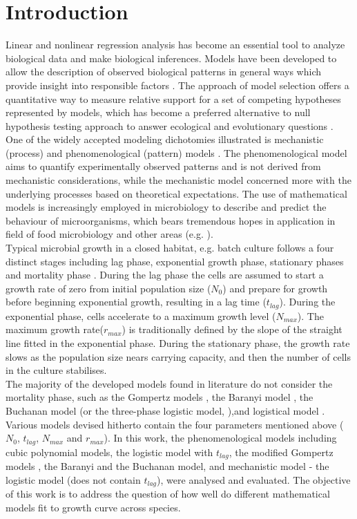 \documentclass[a4paper,11pt]{article}
\theoremstyle{definition}
\begin{document}
\section{Introduction}
Linear and nonlinear regression analysis has become an essential tool to analyze biological data and make biological inferences. Models have been developed to allow the description of observed biological patterns in general ways which provide insight into responsible factors \citep{johnson2004model}. The approach of model selection offers a quantitative way to measure relative support for a set of competing hypotheses represented by models, which has become a preferred alternative to null hypothesis testing approach to answer ecological and evolutionary questions \citep{hilborn1997ecological}. \\
One of the widely accepted modeling dichotomies illustrated is mechanistic (process) and phenomenological (pattern) models \citep{bolker2008ecological}. The phenomenological model aims to quantify experimentally observed patterns and is not derived from mechanistic considerations, while the mechanistic model concerned more with the underlying processes based on theoretical expectations. The use of mathematical models is increasingly employed in microbiology to describe and predict the behaviour of microorganisms, which bears tremendous hopes in application in field of food microbiology and other areas (e.g. \citealp{baranyi1995mathematics}).\\
Typical microbial growth in a closed habitat, e.g. batch culture follows a four distinct stages including lag phase, exponential growth phase, stationary phases and mortality phase \citep{mckellar2004primary}. During the lag phase
the cells are assumed to start a growth rate of zero from initial population size ($N_{0}$) and prepare for growth before beginning exponential growth, resulting in a lag time ($t_{lag}$). During the exponential phase, cells accelerate to a maximum growth level ($N_{max}$). The maximum growth rate($r_{max}$) is traditionally defined by the slope of the straight line fitted in the exponential phase. During the stationary phase, the growth rate slows as the population size nears carrying capacity, and then the number of cells in the culture stabilises.\\
The majority of the developed models found in literature do not consider the mortality phase, such as the Gompertz models \citep{gibson1988predicting}, the Baranyi model \citep{baranyi1995mathematics}, the Buchanan model (or the three-phase logistic model, \citealp{buchanan1997simple}),and logistical model \citep{ricker1979growth}. \\
Various models devised hitherto contain the four parameters mentioned above ($N_{0}$, $t_{lag}$, $N_{max}$ and $r_{max}$). In this work, the phenomenological models including cubic polynomial models,  the logistic model with $t_{lag}$, the modified Gompertz models \citep{zwietering1990modeling}, the Baranyi and the Buchanan model, and mechanistic model - the logistic model (does not contain $t_{lag}$), were analysed and evaluated. The objective of this work is to address the question of how well do different mathematical models fit to growth curve across species.
\end{document}
